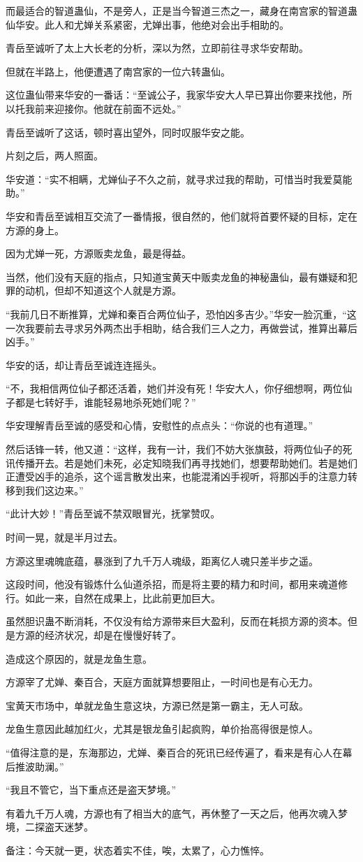 \begin{this_body}
而最适合的智道蛊仙，不是旁人，正是当今智道三杰之一，藏身在南宫家的智道蛊仙华安。此人和尤婵关系紧密，尤婵出事，他绝对会出手相助的。

青岳至诚听了太上大长老的分析，深以为然，立即前往寻求华安帮助。

但就在半路上，他便遭遇了南宫家的一位六转蛊仙。

这位蛊仙带来华安的一番话：“至诚公子，我家华安大人早已算出你要来找他，所以托我前来迎接你。他就在前面不远处。”

青岳至诚听了这话，顿时喜出望外，同时叹服华安之能。

片刻之后，两人照面。

华安道：“实不相瞒，尤婵仙子不久之前，就寻求过我的帮助，可惜当时我爱莫能助。”

华安和青岳至诚相互交流了一番情报，很自然的，他们就将首要怀疑的目标，定在方源的身上。

因为尤婵一死，方源贩卖龙鱼，最是得益。

当然，他们没有天庭的指点，只知道宝黄天中贩卖龙鱼的神秘蛊仙，最有嫌疑和犯罪的动机，但却不知道这个人就是方源。

“我前几日不断推算，尤婵和秦百合两位仙子，恐怕凶多吉少。”华安一脸沉重，“这一次我要前去寻求另外两杰出手相助，结合我们三人之力，再做尝试，推算出幕后凶手。”

华安的话，却让青岳至诚连连摇头。

“不，我相信两位仙子都还活着，她们并没有死！华安大人，你仔细想啊，两位仙子都是七转好手，谁能轻易地杀死她们呢？”

华安理解青岳至诚的感受和心情，安慰性的点点头：“你说的也有道理。”

然后话锋一转，他又道：“这样，我有一计，我们不妨大张旗鼓，将两位仙子的死讯传播开去。若是她们未死，必定知晓我们再寻找她们，想要帮助她们。若是她们正遭受凶手的追杀，这个谣言散发出来，也能混淆凶手视听，将那凶手的注意力转移到我们这边来。”

“此计大妙！”青岳至诚不禁双眼冒光，抚掌赞叹。

时间一晃，就是半月过去。

方源这里魂魄底蕴，暴涨到了九千万人魂级，距离亿人魂只差半步之遥。

这段时间，他没有锻炼什么仙道杀招，而是将主要的精力和时间，都用来魂道修行。如此一来，自然在成果上，比此前更加巨大。

虽然胆识蛊不断消耗，不仅没有给方源带来巨大盈利，反而在耗损方源的资本。但是方源的经济状况，却是在慢慢好转了。

造成这个原因的，就是龙鱼生意。

方源宰了尤婵、秦百合，天庭方面就算想要阻止，一时间也是有心无力。

宝黄天市场中，单就龙鱼生意这块，方源已然是第一霸主，无人可敌。

龙鱼生意因此越加红火，尤其是银龙鱼引起疯购，单价抬高得很是惊人。

“值得注意的是，东海那边，尤婵、秦百合的死讯已经传遍了，看来是有心人在幕后推波助澜。”

“我且不管它，当下重点还是盗天梦境。”

有着九千万人魂，方源也有了相当大的底气，再休整了一天之后，他再次魂入梦境，二探盗天迷梦。

备注：今天就一更，状态着实不佳，唉，太累了，心力憔悴。

\end{this_body}

